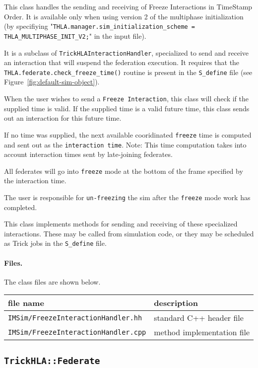 This class handles the sending and receiving of Freeze Interactions in
TimeStamp Order. It is available only when using version 2 of the multiphase
initialization (by specifiying "{\tt THLA.manager.sim\_initialization\_scheme = THLA\_MULTIPHASE\_INIT\_V2;}"
in the input file).

It is a subclass of {\tt TrickHLAInteractionHandler}, specialized to 
send and receive an interaction that will suspend the federation execution. It 
requires that the {\tt THLA.federate.check\_freeze\_time()} routine is present 
in the {\tt S\_define} file (see Figure~\ref{fig:default-sim-object}).

When the user wishes to send a {\tt Freeze Interaction}, this class will check 
if the supplied time is valid. If the supplied time is a valid future time, 
this class sends out an interaction for this future time.

If no time was supplied, the next available cooridinated {\tt freeze} time is 
computed and sent out as the {\tt interaction time}. Note: This time 
computation takes into account interaction times sent by late-joining federates.

All federates will go into {\tt freeze} mode at the bottom of the 
frame specified by the interaction time.

The user is responsible for {\tt un-freezing} the sim after the {\tt freeze} 
mode work has completed.

This class implements methods for sending and receiving of these specialized 
interactions. These may be called from simulation code, or they may be 
scheduled as Trick jobs in the {\tt S\_define} file.

\paragraph{Files.}
The class files are shown below.

{
  \scriptsize
  \begin{tabular}{|l|l|}
    \hline
    file name & description \\
    \hline \hline
    {\tt IMSim/FreezeInteractionHandler.hh}
    & standard C++ header file
    \\ \hline
    {\tt IMSim/FreezeInteractionHandler.cpp}
    & method implementation file
    \\ \hline
  \end{tabular}
}

\subsection{{\tt TrickHLA::Federate}}

